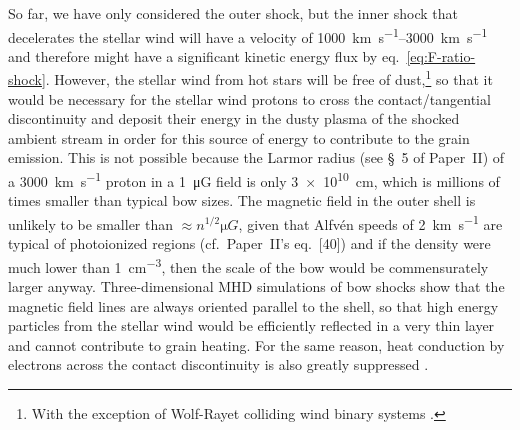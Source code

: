 So far, we have only considered the outer shock, but the inner shock
that decelerates the stellar wind will have a velocity of
\SIrange{1000}{3000}{km.s^{-1}} and therefore might have a significant
kinetic energy flux by eq.~\eqref{eq:F-ratio-shock}.  However, the
stellar wind from hot stars will be free of dust,\footnote{%
  With the exception of Wolf-Rayet colliding wind binary systems
  \citep{Tuthill:1999a, Callingham:2019a}.} %
so that it would be necessary for the stellar wind protons to cross
the contact/tangential discontinuity and deposit their energy in the
dusty plasma of the shocked ambient stream in order for this source of
energy to contribute to the grain emission.  This is not possible
because the Larmor radius (see \S~5 of Paper~II)
of a \SI{3000}{km.s^{-1}} proton in a \SI{1}{\micro G} field is only
\SI{3e10}{cm}, which is millions of times smaller than typical bow
sizes.  The magnetic field in the outer shell is unlikely to be
smaller than \(\approx n^{1/2} \si{\micro G}\), given that Alfvén speeds of
\SI{2}{km.s^{-1}} are typical of photoionized regions (cf.~Paper~II's
eq.~[40])
and if the density were much lower than
\SI{1}{cm^{-3}}, then the scale of the bow would be commensurately
larger anyway.  Three-dimensional MHD simulations of bow shocks
\citep{Katushkina:2017a, Gvaramadze:2018a} show that the magnetic
field lines are always oriented parallel to the shell, so that high
energy particles from the stellar wind would be efficiently reflected
in a very thin layer and cannot contribute to grain heating.  For the
same reason, heat conduction by electrons across the contact
discontinuity is also greatly suppressed \citep{Meyer:2017a}.



